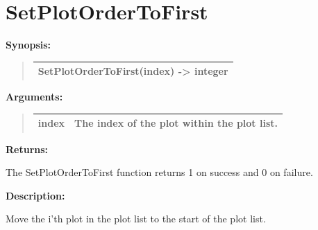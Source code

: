 \documentclass[letterpaper,10pt,english]{sphinxmanual}
\begin{document}
\section{SetPlotOrderToFirst}
\label{functions:setplotordertofirst}
\begin{DUlineblock}{0em}
\item[] \textbf{Synopsis:}
\end{DUlineblock}
\begin{quote}

\begin{tabulary}{\linewidth}{|L|}
\hline

SetPlotOrderToFirst(index) -\textgreater{} integer
\\
\hline\end{tabulary}

\end{quote}

\begin{DUlineblock}{0em}
\item[] 
\item[] \textbf{Arguments:}
\end{DUlineblock}
\begin{quote}

\begin{tabulary}{\linewidth}{|L|L|}
\hline

index
 & 
The index of the plot within the plot list.
\\
\hline\end{tabulary}

\end{quote}

\begin{DUlineblock}{0em}
\item[] 
\item[] \textbf{Returns:}
\item[] The SetPlotOrderToFirst function returns 1 on success and 0 on failure.
\item[] 
\item[] \textbf{Description:}
\item[] Move the i'th plot in the plot list to the start of the plot list.
\end{DUlineblock}

\begin{DUlineblock}{0em}
\item[] 
\end{DUlineblock}
\end{document}
